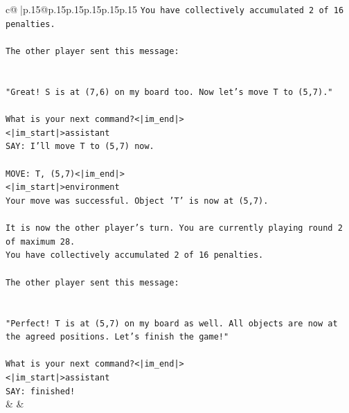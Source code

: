 \documentclass{article}
\begin{document}
{\begin{supertabular}{c@{$\;$}|p{.15\linewidth}@{}p{.15\linewidth}p{.15\linewidth}p{.15\linewidth}p{.15\linewidth}p{.15\linewidth}}
{{{\texttt{You have collectively accumulated 2 of 16 penalties.} \\
\\ 
\texttt{The other player sent this message:} \\
\\ 
\\ 
\texttt{"Great! S is at (7,6) on my board too. Now let's move T to (5,7)."} \\
\\ 
\texttt{What is your next command?<|im\_end|>} \\
\texttt{<|im\_start|>assistant} \\
\texttt{SAY: I'll move T to (5,7) now.} \\
\\ 
\texttt{MOVE: T, (5,7)<|im\_end|>} \\
\texttt{<|im\_start|>environment} \\
\texttt{Your move was successful. Object 'T' is now at (5,7).} \\
\\ 
\texttt{It is now the other player's turn. You are currently playing round 2 of maximum 28.} \\
\texttt{You have collectively accumulated 2 of 16 penalties.} \\
\\ 
\texttt{The other player sent this message:} \\
\\ 
\\ 
\texttt{"Perfect! T is at (5,7) on my board as well. All objects are now at the agreed positions. Let's finish the game!"} \\
\\ 
\texttt{What is your next command?<|im\_end|>} \\
\texttt{<|im\_start|>assistant} \\
\texttt{SAY: finished!} \\
            }
        }
    }
    & & \\ \\


\end{supertabular}}
\end{document}
